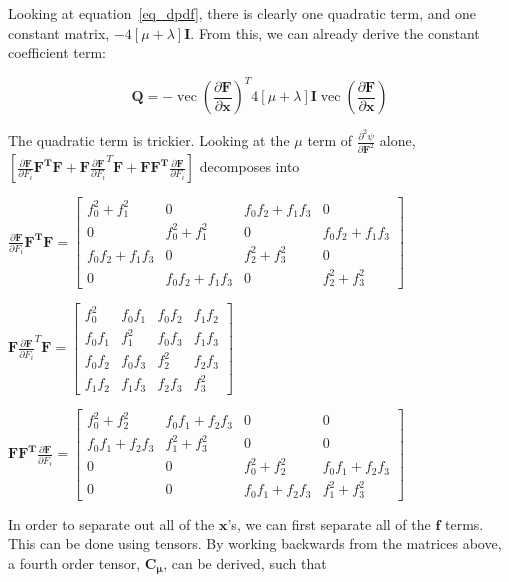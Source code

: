 \documentclass[twocolumn,10pt]{asme2ej}
\DeclareMathOperator{\vect}{vec}
\begin{document}
Looking at equation~\ref{eq_dpdf}, there is clearly one quadratic term, and one constant matrix, $-4[\mu + \lambda]\bm{I}$. From this, we can already derive the constant coefficient term:

\begin{equation}
  \bm{Q} = - \vect \left(\frac{\partial \bm{F}}{\partial \bm{x}}\right)^T 4[\mu + \lambda]\bm{I} \vect \left(\frac{\partial \bm{F}}{\partial \bm{x}}\right)
  \label{eq_unreducedConst}
\end{equation}

The quadratic term is trickier. Looking at the $\mu$ term of $\frac{\partial^2 \psi}{\partial \bm{F}^2}$ alone, $\left[\frac{\partial \bm{F}}{\partial F_i}\bm{F^TF} + \bm{F}\frac{\partial \bm{F}}{\partial F_i}^T\bm{F} + \bm{FF^T}\frac{\partial \bm{F}}{\partial F_i}\right]$ decomposes into

\begin{center}
$\frac{\partial \bm{F}}{\partial F_i}\bm{F^TF} = \begin{bmatrix} f_{0}^2 + f_{1}^2 & 0 & f_0f_2 + f_1f_3 & 0 \\
0 & f_{0}^2 + f_{1}^2 & 0 & f_0f_2 + f_1f_3 \\
f_0f_2 + f_1f_3 & 0 & f_{2}^2 + f_{3}^2 & 0 \\
0 & f_0f_2 + f_1f_3 & 0 & f_{2}^2 + f_{3}^2 \end{bmatrix}$

\bigskip
$\bm{F}\frac{\partial \bm{F}}{\partial F_i}^T\bm{F} = \begin{bmatrix} f_{0}^2 & f_0f_1 & f_0f_2 & f_1f_2  \\
f_0f_1 & f_{1}^2 & f_0f_3 & f_1f_3 \\
f_0f_2 & f_0f_3 & f_{2}^2 & f_2f_3 \\
f_1f_2 & f_1f_3 & f_2f_3 & f_{3}^2 \end{bmatrix}$

\bigskip
$\bm{FF^T}\frac{\partial \bm{F}}{\partial F_i} = \begin{bmatrix} f_{0}^2 + f_{2}^2 & f_0f_1 + f_2f_3 & 0 & 0  \\
f_0f_1 + f_2f_3 & f_{1}^2 + f_{3}^2 & 0 & 0 \\
0 & 0 & f_{0}^2 + f_{2}^2 & f_0f_1 + f_2f_3 \\
0 & 0 & f_0f_1 + f_2f_3 & f_{1}^2 + f_{3}^2 \end{bmatrix}$
\end{center}

In order to separate out all of the $\bm{x}$'s, we can first separate all of the $\bm{f}$ terms. This can be done using tensors. By working backwards from the matrices above, a fourth order tensor, $\bm{C_{\mu}}$, can be derived, such that
\end{document}
